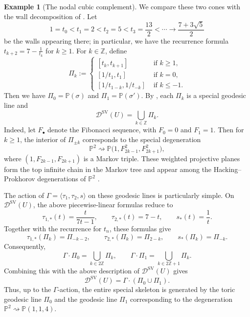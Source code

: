 \documentclass[reqno, 12pt]{amsart}
\theoremstyle{definition}
\newtheorem{expl}[prop]{Example}
\newcommand{\bP}{\mathbb{P}}
\newcommand{\bZ}{\mathbb{Z}}
\newcommand{\cD}{\mathcal{D}}
\newcommand{\Aut}{\mathrm{Aut}}
\newcommand{\SV}{\mathrm{SV}}
\numberwithin{equation}{section}
\begin{document}
\begin{expl}[The nodal cubic complement]
We compare these two cones with the wall decomposition of
\cite[Section~6]{LXZ22}. Let
\[
1=t_0<t_1=2<t_2=5<t_3=\frac{13}{2}<\cdots
\longrightarrow \frac{7+3\sqrt5}{2}
\]
be the walls appearing there; in particular, we have the recurrence formula $t_{k+2}=7-\frac1{t_k}$ for $k\geq 1$.
For $k\in\bZ$, define
\[
\Pi_k:=
\begin{cases}
[t_k,t_{k+1}] & \textrm{ if }k\geq 1,\\
[1/t_1, t_1] & \textrm{ if }k = 0,\\
[1/t_{1-k},1/t_{-k}] & \textrm{ if }k\leq -1.
\end{cases}
\]
Then we have $
\Pi_0=\bP(\sigma)$ and $\Pi_1=\bP(\sigma')$.
By \cite[Section~6]{LXZ22}, each $\Pi_k$ is a special geodesic line and
\[
\cD^{\SV}(U)=\bigcup_{k\in\bZ}\Pi_k.
\]
Indeed, let $F_\bullet$ denote the Fibonacci sequence, with $F_0=0$ and $F_1=1$. Then for $k\geq 1$, the interior of $\Pi_{\pm k}$ corresponds to the special degeneration
\[
\bP^2 \rightsquigarrow
\bP\bigl(1,F_{2k-1}^2,F_{2k+1}^2\bigr),
\]
where $(1,F_{2k-1},F_{2k+1})$ is a Markov triple. These weighted projective planes form the top infinite chain in the Markov tree and appear among the
Hacking--Prokhorov degenerations of $\bP^2$ \cite{HP10}.

The action of $
\Gamma=\langle\tau_1,\tau_2,s\rangle$
on these geodesic lines is particularly simple. On $\cD^{\SV}(U)$, the above piecewise-linear formulas reduce to 
\[
\tau_{1,*}(t)=\frac{t}{7t-1},
\qquad
\tau_{2,*}(t)=7-t,
\qquad
s_*(t)=\frac1t.
\]
Together with the recurrence for $t_n$, these formulas
give
\[
\tau_{1,*}(\Pi_k)=\Pi_{-k-2},
\qquad
\tau_{2,*}(\Pi_k)=\Pi_{2-k},
\qquad
s_*(\Pi_k)=\Pi_{-k}.
\]
Consequently,
\[
\Gamma\cdot\Pi_0=\bigcup_{k\in2\bZ}\Pi_k,
\qquad
\Gamma\cdot\Pi_1=\bigcup_{k\in2\bZ+1}\Pi_k.
\]
Combining this with the above description of $\cD^{\SV}(U)$ gives
\[
\cD^{\SV}(U)
=
\Gamma\cdot(\Pi_0\cup\Pi_1).
\]
Thus, up to the $\Gamma$-action, the entire special skeleton is generated
by the toric geodesic line $\Pi_0$ and the geodesic line $\Pi_1$
corresponding to the degeneration
$\bP^2\rightsquigarrow\bP(1,1,4)$.


\end{expl}
\end{document}
